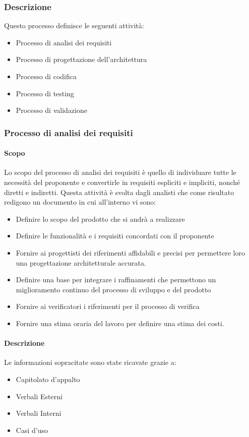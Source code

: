 \subsubsection{Descrizione}
Questo processo definisce le seguenti attività:
\begin{itemize}
  \item Processo di analisi dei requisiti
  \item Processo di progettazione dell'architettura
  \item Processo di codifica
  \item Processo di testing
  \item Processo di validazione
\end{itemize}

\subsubsection{Processo di analisi dei requisiti}
\paragraph{Scopo}
Lo scopo del processo di analisi dei requisiti è quello di individuare tutte le necessità del proponente e convertirle in requisiti espliciti e impliciti, nonché diretti e indiretti. Questa attività è svolta dagli analisti che come risultato redigono un documento in cui all'interno vi sono:
\begin{itemize}
  \item Definire lo scopo del prodotto che si andrà a realizzare
  \item Definire le funzionalità e i requisiti concordati con il proponente
  \item Fornire ai progettisti dei riferimenti affidabili e precisi per permettere loro una progettazione architetturale accurata.
  \item Definire una base per integrare i raffinamenti che permettono un miglioramento continuo del processo di sviluppo e del prodotto
  \item Fornire ai verificatori i riferimenti per il processo di verifica
  \item Fornire una stima oraria del lavoro per definire una stima dei costi.
\end{itemize}

\paragraph{Descrizione}
Le informazioni sopracitate sono state ricavate grazie a:
\begin{itemize}
  \item Capitolato d'appalto
  \item Verbali Esterni
  \item Verbali Interni
  \item Casi d'uso
\end{itemize}

